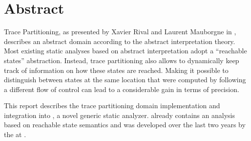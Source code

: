 \chapter*{Abstract}
	\label{Abstract}

	Trace Partitioning, as presented by Xavier Rival and Laurent Mauborgne in \cite{mauborgne:rival05}, describes an abstract domain according to the abstract interpretation theory. Most existing static analyses based on abstract interpretation adopt a ``reachable states'' abstraction. Instead, trace partitioning also allows to dynamically keep track of information on how these states are reached. Making it possible to distinguish between states at the same location that were computed by following a different flow of control can lead to a considerable gain in terms of precision.

	This report describes the trace partitioning domain implementation and integration into \sample, a novel generic static analyzer. \sample already contains an analysis based on reachable state semantics and was developed over the last two years by the \copm at \ethz. 

